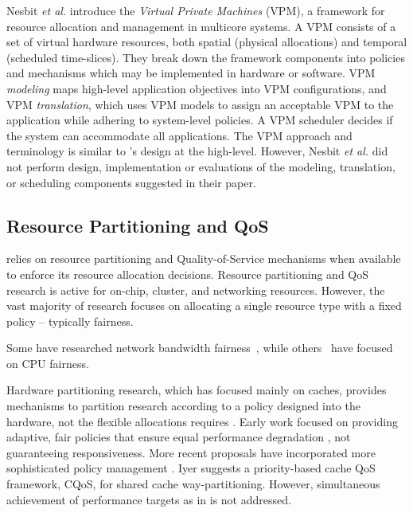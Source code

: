 Nesbit \emph{et al.}\cite{1436097} introduce the \emph{Virtual Private Machines} (VPM), a framework for resource allocation and management in multicore systems. A VPM consists of a set of virtual hardware resources, both spatial (physical allocations) and temporal (scheduled time-slices).  They break down the framework components into policies and mechanisms which may be implemented in hardware or software. VPM {\em modeling} maps high-level application objectives into VPM configurations, and VPM {\em translation}, which uses VPM models to assign an acceptable VPM to the application while adhering to system-level policies. A VPM scheduler decides if the system can accommodate all applications. The VPM approach and terminology is similar to \pacora's design at the high-level.  However, Nesbit \emph{et al.} did not perform design, implementation or evaluations of the modeling, translation, or scheduling components suggested in their paper.

%

\subsection{Resource Partitioning and QoS}
\label{sec:rel:pm}


\pacora relies on resource partitioning and Quality-of-Service mechanisms when available to enforce its resource allocation decisions.  Resource partitioning and QoS research is active for on-chip, cluster, and networking resources.  However, the vast majority of research focuses on allocating a single resource type with a fixed policy -- typically fairness.

Some have researched network bandwidth fairness~\cite{Blanquer, Kleinberg99fairnessin, Liu}, while others~\cite{Baruah96proportionateprogress, Baruah_fastscheduling, Zhu} have focused on CPU fairness. 

Hardware partitioning research, which has focused mainly on caches, provides mechanisms to partition research according to a policy designed into the hardware, not the flexible allocations \pacora requires \cite{876484, 967444,1194855,1275005,1194858,1318096,1088154,1399973,1069998,1399982} .  Early work focused on providing adaptive, fair policies that ensure equal performance degradation \cite{605420,1086328}, not guaranteeing responsiveness. More recent proposals have incorporated more sophisticated policy management \cite{1241608,1331730,1152161,1254886}. Iyer\cite{1006246} suggests a priority-based cache QoS framework, CQoS, for shared cache way-partitioning. 
However, simultaneous achievement of performance targets as in \pacora is not addressed.


